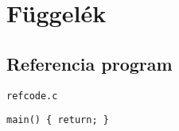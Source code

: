 
\chapter{Függelék}


\section{Referencia program}
\texttt{refcode.c}
\begin{lstlisting}[frame=single,float=!ht,caption=A referencia programkódja,label=listing:refprog]
main() { return; }
\end{lstlisting}
